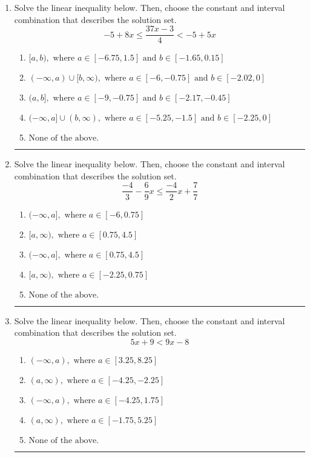 \documentclass[14pt]{extbook}
\newcommand{\litem}[1]{\item#1\hspace*{-1cm}\rule{\textwidth}{0.4pt}}
\begin{document}
\begin{enumerate}
\litem{
Solve the linear inequality below. Then, choose the constant and interval combination that describes the solution set.\[ -5 + 8 x \leq \frac{37 x - 3}{4} < -5 + 5 x \]\begin{enumerate}[label=\Alph*.]
\item \( [a, b), \text{ where } a \in [-6.75, 1.5] \text{ and } b \in [-1.65, 0.15] \)
\item \( (-\infty, a) \cup [b, \infty), \text{ where } a \in [-6, -0.75] \text{ and } b \in [-2.02, 0] \)
\item \( (a, b], \text{ where } a \in [-9, -0.75] \text{ and } b \in [-2.17, -0.45] \)
\item \( (-\infty, a] \cup (b, \infty), \text{ where } a \in [-5.25, -1.5] \text{ and } b \in [-2.25, 0] \)
\item \( \text{None of the above.} \)

\end{enumerate} }
\litem{
Solve the linear inequality below. Then, choose the constant and interval combination that describes the solution set.\[ \frac{-4}{3} - \frac{6}{9} x \leq \frac{-4}{2} x + \frac{7}{7} \]\begin{enumerate}[label=\Alph*.]
\item \( (-\infty, a], \text{ where } a \in [-6, 0.75] \)
\item \( [a, \infty), \text{ where } a \in [0.75, 4.5] \)
\item \( (-\infty, a], \text{ where } a \in [0.75, 4.5] \)
\item \( [a, \infty), \text{ where } a \in [-2.25, 0.75] \)
\item \( \text{None of the above}. \)

\end{enumerate} }
\litem{
Solve the linear inequality below. Then, choose the constant and interval combination that describes the solution set.\[ 5x + 9 < 9x -8 \]\begin{enumerate}[label=\Alph*.]
\item \( (-\infty, a), \text{ where } a \in [3.25, 8.25] \)
\item \( (a, \infty), \text{ where } a \in [-4.25, -2.25] \)
\item \( (-\infty, a), \text{ where } a \in [-4.25, 1.75] \)
\item \( (a, \infty), \text{ where } a \in [-1.75, 5.25] \)
\item \( \text{None of the above}. \)


\end{enumerate}}
\end{enumerate}
\end{document}
